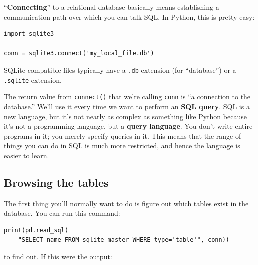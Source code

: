 
``\textbf{Connecting}'' to a relational database basically means establishing a
communication path over which you can talk SQL. In Python, this is pretty easy:

\begin{Verbatim}[fontsize=\small,samepage=true,frame=single,framesep=3mm]
import sqlite3

conn = sqlite3.connect('my_local_file.db')
\end{Verbatim}
\label{connectSqlite}


SQLite-compatible files typically have a \texttt{.db} extension (for
``database'') or a \texttt{.sqlite} extension.


The return value from \texttt{connect()} that we're calling \texttt{conn} is
``a connection to the database.'' We'll use it every time we want to perform an
\textbf{SQL query}. SQL is a new language, but it's not nearly as complex as
something like Python because it's not a programming language, but a
\textbf{query language}. You don't write entire programs in it; you merely
specify queries in it. This means that the range of things you can do in SQL is
much more restricted, and hence the language is easier to learn.

\subsection{Browsing the tables}


The first thing you'll normally want to do is figure out which tables exist in
the database. You can run this command:

\label{sqlite_master}

\begin{Verbatim}[fontsize=\footnotesize,samepage=true,frame=single,framesep=3mm]
print(pd.read_sql(
    "SELECT name FROM sqlite_master WHERE type='table'", conn))
\end{Verbatim}

to find out. If this were the output:

